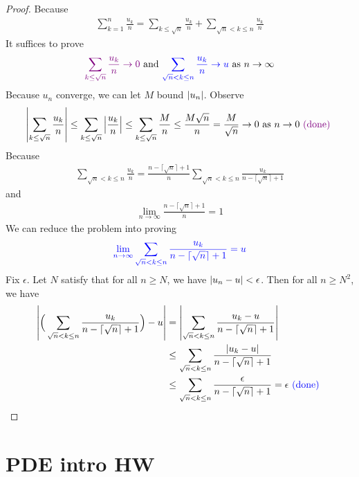 \documentclass{report}
\begin{document}
\begin{proof}
Because 
\begin{align*}
\sum_{k=1}^n \frac{u_k}{n}=\sum_{k\leq \sqrt{n}}\frac{u_k}{n}+ \sum_{\sqrt{n}<k\leq n}\frac{u_k}{n}
\end{align*}
It suffices to prove 
\begin{align*}
\textcolor{violet}{\sum_{k\leq \sqrt{n} }\frac{u_k}{n}\to 0}\text{ and }\textcolor{blue}{\sum_{\sqrt{n}<k\leq n}\frac{u_k}{n}\to u}\text{ as }n\to \infty
\end{align*}
Because $u_n$ converge, we can let  $M$ bound  $\left|u_n\right|$. Observe 
\begin{align*}
\left|\sum_{k\leq \sqrt{n} } \frac{u_k}{n}\right|\leq \sum_{k\leq \sqrt{n}} \left|\frac{u_k}{n}\right|\leq \sum_{k\leq \sqrt{n}} \frac{M}{n}\leq \frac{M\sqrt{n} }{n}=\frac{M}{\sqrt{n}}\to 0\text{ as }n\to 0\textcolor{violet}{\text{ (done) }}
\end{align*}
Because 
\begin{align*}
\sum_{\sqrt{n}<k\leq n} \frac{u_k}{n}= \frac{n-\lceil \sqrt{n}\rceil +1 }{n}\sum_{\sqrt{n}<k\leq n} \frac{u_k}{n-\lceil \sqrt{n}  \rceil+1}
\end{align*}
and 
\begin{align*}
  \lim_{n\to \infty} \frac{n- \lceil \sqrt{n}\rceil +1 }{n}=1
\end{align*}
We can reduce the problem into proving 
\begin{align*}
  \textcolor{blue}{\lim_{n\to \infty}\sum_{\sqrt{n}<k\leq n} \frac{u_k}{n- \lceil \sqrt{n}\rceil +1 }=u}
\end{align*}
Fix $\epsilon $. Let $N$ satisfy that for all  $n\geq N$, we have $\left|u_n-u\right|<\epsilon $. Then for all $n \geq N^2$, we have 
\begin{align*}
  \left|\Big(\sum_{\sqrt{n}<k \leq n } \frac{u_k}{n-\lceil \sqrt{n}\rceil +1 } \Big)- u\right|  &=\left|\sum_{\sqrt{n}<k\leq n } \frac{u_k-u}{n-\lceil \sqrt{n}\rceil +1 } \right|\\
  &\leq \sum_{\sqrt{n}<k\leq n} \frac{\left|u_k-u\right|}{n-\lceil \sqrt{n}\rceil +1  }\\
  &\leq \sum_{\sqrt{n}<k\leq n} \frac{\epsilon }{n-\lceil \sqrt{n}\rceil +1  }=\epsilon \textcolor{blue}{\text{ (done) }}
\end{align*}
\end{proof}
\chapter{PDE intro HW}
\end{document}
